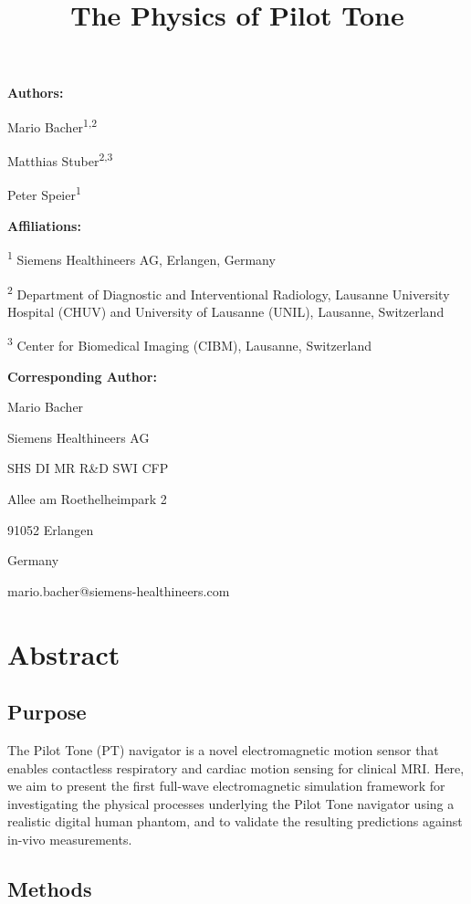 \documentclass[
]{article}
\title{The Physics of Pilot Tone}
\author{}
\date{}
\begin{document}
\maketitle

\textbf{Authors:}

Mario Bacher\textsuperscript{1,2}

Matthias Stuber\textsuperscript{2,3}

Peter Speier\textsuperscript{1}

\textbf{Affiliations:}

\textsuperscript{1} Siemens Healthineers AG, Erlangen, Germany

\textsuperscript{2} Department of Diagnostic and Interventional
Radiology, Lausanne University Hospital (CHUV) and University of
Lausanne (UNIL), Lausanne, Switzerland

\textsuperscript{3} Center for Biomedical Imaging (CIBM), Lausanne,
Switzerland

\textbf{Corresponding Author:}

Mario Bacher

Siemens Healthineers AG

SHS DI MR R\&D SWI CFP

Allee am Roethelheimpark 2

91052 Erlangen

Germany

mario.bacher@siemens-healthineers.com

\section{Abstract}\label{abstract}

\subsection{Purpose}\label{purpose}

The Pilot Tone (PT) navigator is a novel electromagnetic motion sensor
that enables contactless respiratory and cardiac motion sensing for
clinical MRI. Here, we aim to present the first full-wave electromagnetic simulation framework for investigating the
physical processes underlying the Pilot Tone navigator using a realistic digital human phantom, and to validate the resulting predictions against in-vivo measurements.

\subsection{Methods}\label{methods}
\end{document}
